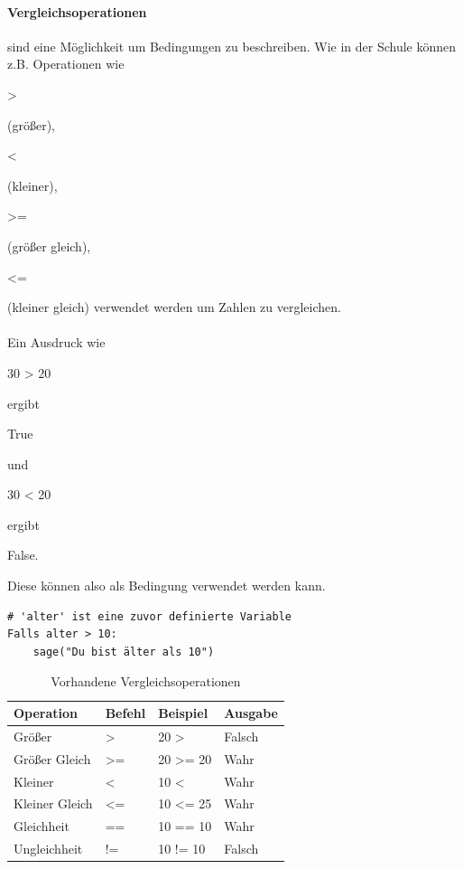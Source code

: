 \documentclass[12pt,a4paper,oneside,ngerman]{scrbook}
\newcommand{\code}[1]{
	\begin{ttfamily}#1\end{ttfamily}
}
\begin{document}
\paragraph{Vergleichsoperationen} sind eine Möglichkeit um Bedingungen zu beschreiben. Wie in der Schule können z.B. Operationen wie \code{>} (größer), \code{<} (kleiner),\code{>=} (größer gleich), \code{<=} (kleiner gleich) verwendet werden um Zahlen zu vergleichen.
\\
\\
Ein Ausdruck wie \code{30 > 20} ergibt \code{True} und \code{30 < 20} ergibt \code{False.} Diese können also als Bedingung verwendet werden kann.

\begin{lstlisting}[style=Pseudo]
# 'alter' ist eine zuvor definierte Variable
Falls alter > 10:
	sage("Du bist älter als 10")
\end{lstlisting}

\clearpage

\begin{table}[t,clr]
	\begin{center}
	\begin{tabular}{|l|l|l|l|}
		\hline
		Operation		& Befehl		   	& Beispiel			 				& Ausgabe\\ \hline\hline
		Größer         	& \textgreater  	& 20 \textgreater\space20  			& Falsch \\ \hline
		Größer Gleich  	& \textgreater= 	& 20 \textgreater= 20 				& Wahr   \\ \hline
		Kleiner        	& \textless     	& 10 \textless\space30				& Wahr   \\ \hline
		Kleiner Gleich	& \textless=    	& 10 \textless= 25	    			& Wahr   \\ \hline
		Gleichheit    	& ==            	& 10 == 10	            			& Wahr   \\ \hline
		Ungleichheit  	& !=            	& 10 != 10            				& Falsch \\ \hline
	\end{tabular}
	\caption{Vorhandene Vergleichsoperationen}
	\end{center}
\end{table}
\end{document}
